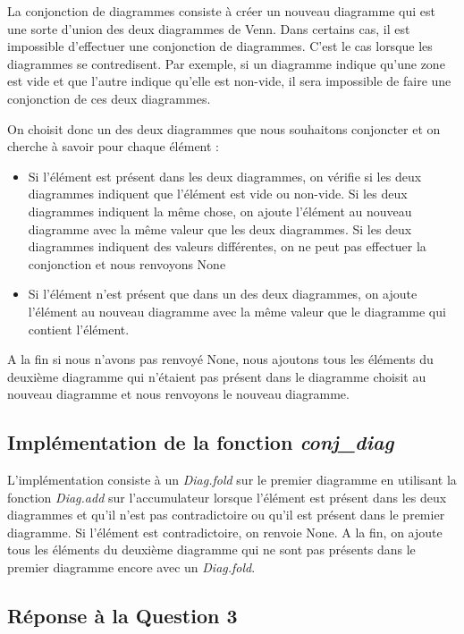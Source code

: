 \documentclass[12pt, letterpaper, french]{article}
\begin{document}
La conjonction de diagrammes consiste à créer un nouveau diagramme qui est 
une sorte d'union des deux diagrammes de Venn. Dans certains cas, il est 
impossible d'effectuer une conjonction de diagrammes. C'est le cas lorsque les 
diagrammes se contredisent. Par exemple, si un diagramme indique qu'une zone est
vide et que l'autre indique qu'elle est non-vide, il sera impossible de faire 
une conjonction de ces deux diagrammes.

On choisit donc un des deux diagrammes que nous souhaitons conjoncter et on 
cherche à savoir pour chaque élément : 
\begin{itemize}
    \item Si l'élément est présent dans les deux diagrammes, on vérifie si les 
    deux diagrammes indiquent que l'élément est vide ou non-vide. Si les deux 
    diagrammes indiquent la même chose, on ajoute l'élément au nouveau diagramme
    avec la même valeur que les deux diagrammes. Si les deux diagrammes 
    indiquent des valeurs différentes, on ne peut pas effectuer la conjonction et nous renvoyons None 
    \item Si l'élément n'est présent que dans un des deux diagrammes, on ajoute
    l'élément au nouveau diagramme avec la même valeur que le diagramme qui 
    contient l'élément.
\end{itemize}

A la fin si nous n'avons pas renvoyé None, nous ajoutons tous les éléments du deuxième diagramme qui n'étaient pas présent dans le diagramme choisit au nouveau diagramme et nous renvoyons le nouveau diagramme.

\subsection{Implémentation de la fonction \emph{conj\_diag}}
L'implémentation consiste à un \emph{Diag.fold} sur le premier diagramme en 
utilisant la fonction \emph{Diag.add} sur l'accumulateur lorsque l'élément est 
présent dans les deux diagrammes et qu'il n'est pas contradictoire ou qu'il est 
présent dans le premier diagramme. Si l'élément est contradictoire, on renvoie
None. A la fin, on ajoute tous les éléments du deuxième diagramme qui ne sont
pas présents dans le premier diagramme encore avec un \emph{Diag.fold}.

\subsection{Réponse à la Question 3}
\end{document}
